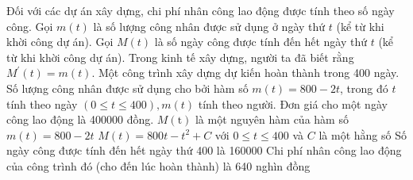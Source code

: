 \begin{ex}
	Đối với các dự án xây dựng, chi phí nhân công lao động được tính theo số ngày công. Gọi $m(t)$ là số lượng công nhân được sử dụng ở ngày thứ $t$ (kể từ khi khời công dự án). Gọi $M(t)$ là số ngày công được tính đến hết ngày thứ $t$ (kể từ khi khời công dự án). Trong kinh tế xây dựng, người ta đã biết rằng $M^{\prime}(t)=m(t)$. Một công trình xây dựng dự kiến hoàn thành trong 400 ngày. Số lượng công nhân được sử dụng cho bởi hàm số $m(t)=800-2 t$, trong đó $t$ tính theo ngày $(0 \leq t \leq 400), m(t)$ tính theo người. Đơn giá cho một ngày công lao động là 400000 đồng.
	\choiceTF
	{\True $M(\mathrm{t})$ là một nguyên hàm của hàm số $m(t)=800-2 t$}
	{\True $M(t)=800 t-t^2+C$ với $0 \leq t \leq 400$ và $C$ là một hằng số}
	{\True Số ngày công được tính đến hết ngày thứ 400 là 160000}
	{Chi phí nhân công lao động của công trình đó (cho đến lúc hoàn thành) là 640 nghìn đồng}
\end{ex}
